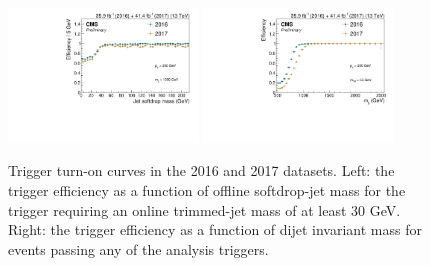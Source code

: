\begin{figure}[h!]
\centering 
\includegraphics[width=0.45\textwidth]{figures/analysis/search3/B2G-18-002/Combined_mj1_16vs17.pdf}
\includegraphics[width=0.45\textwidth]{figures/analysis/search3/B2G-18-002/Combined_mjj_16vs17.pdf}
\caption{Trigger turn-on curves in the 2016 and 2017 datasets. Left: the trigger efficiency as a function of offline softdrop-jet mass for the trigger requiring an online trimmed-jet mass of at least 30 GeV. Right: the trigger efficiency as a function of dijet invariant mass for events passing any of the analysis triggers.}
\label{fig:searchIII:trigturnon}
\end{figure}

